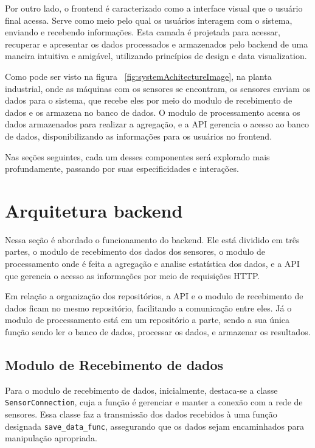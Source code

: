 Por outro lado, o frontend é caracterizado como a interface visual que o usuário final acessa. Serve como meio pelo qual os usuários interagem com o sistema, enviando e recebendo informações. Esta camada é projetada para acessar, recuperar e apresentar os dados processados e armazenados pelo backend de uma maneira intuitiva e amigável, utilizando princípios de design e data visualization.

Como pode ser visto na figura ~\ref{fig:systemAchitectureImage}, na planta industrial, onde as máquinas com os sensores se encontram, os sensores enviam os dados para o sistema, que recebe eles por meio do modulo de recebimento de dados e os armazena no banco de dados. O modulo de processamento acessa os dados armazenados para realizar a agregação, e a \gls{API} gerencia o acesso ao banco de dados, disponibilizando as informações para os usuários no frontend.

Nas seções seguintes, cada um desses componentes será explorado mais profundamente, passando por suas especificidades e interações.


\section[Arquitetura do backend]{Arquitetura backend}
Nessa seção é abordado o funcionamento do backend. Ele está dividido em três partes, o modulo de recebimento dos dados dos sensores, o modulo de processamento onde é feita a agregação e analise estatística dos dados, e a \gls{API} que gerencia o acesso as informações por meio de requisições \gls{HTTP}.

Em relação a organização dos repositórios, a \gls{API} e o modulo de recebimento de dados ficam no mesmo repositório, facilitando a comunicação entre eles. Já o modulo de processamento está em um repositório a parte, sendo a sua única função sendo ler o banco de dados, processar os dados, e armazenar os resultados.

\subsection{Modulo de Recebimento de dados}
Para o modulo de recebimento de dados, inicialmente, destaca-se a classe \texttt{SensorConnection}, cuja a função é gerenciar e manter a conexão com a rede de sensores. Essa classe faz a transmissão dos dados recebidos à uma função designada \texttt{save\_data\_func}, assegurando que os dados sejam encaminhados para manipulação apropriada.

